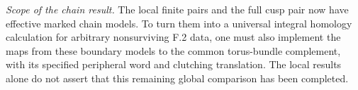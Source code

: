 \emph{Scope of the chain result.}
The local finite pairs and the full cusp pair now have
effective marked chain models.  To turn them into a universal
integral homology calculation for arbitrary nonsurviving F.2
data, one must also implement the maps from these boundary
models to the common torus-bundle complement, with its
specified peripheral word and clutching translation.  The
local results alone do not assert that this remaining global
comparison has been completed.
